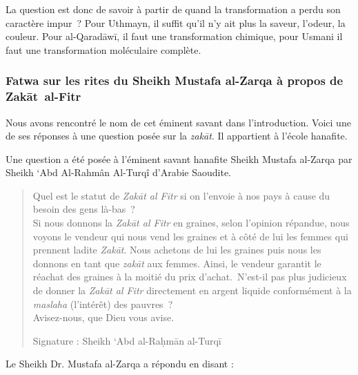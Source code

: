 La question est donc de savoir à partir de quand la transformation a
perdu son caractère impur~? Pour Uthmayn, il suffit qu'il n'y ait plus
la saveur, l'odeur, la couleur. Pour al-Qaradāwī, il faut une
transformation chimique, pour Usmani il faut une transformation
moléculaire complète.

\subsubsection{Fatwa sur les rites du Sheikh Mustafa al-Zarqa à propos de
Zakāt~al-Fitr}

Nous avons rencontré le nom de cet éminent savant dans l'introduction.
Voici une de ses réponses à une question posée sur la \emph{zakāt}. Il
appartient à l'école hanafite.

Une question a été posée à l'éminent savant hanafite Sheikh Mustafa
al-Zarqa par Sheikh `Abd Al-Rahmân Al-Turqî d'Arabie Saoudite.~
\begin{quote}
    

Quel est le statut de \emph{Zakāt al Fitr} si on l'envoie à nos pays à
cause du besoin des gens là-bas~?\\
Si nous donnons la \emph{Zakāt al Fitr} en graines, selon l'opinion
répandue, nous voyons le vendeur qui nous vend les graines et à côté de
lui les femmes qui prennent ladite \emph{Zakāt}. Nous achetons de lui
les graines puis nous les donnons en tant que \emph{zakāt} aux femmes.
Ainsi, le vendeur garantit le réachat des graines à la moitié du prix
d'achat.~N'est-il pas plus judicieux de donner la \emph{Zakāt al Fitr}
directement en argent liquide conformément à la \emph{maslaha}
(l'intérêt) des pauvres~?\\
Avisez-nous, que Dieu vous avise.

Signature : Sheikh `Abd al-Raḥmān al-Turqī
\end{quote}
Le Sheikh Dr. Mustafa al-Zarqa a répondu en disant :
